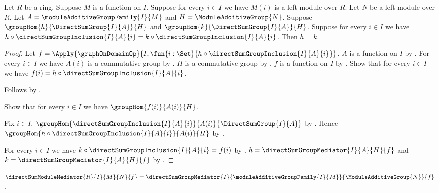 \begin{theorem}\label{direct_sum_module_additive_map_extensionality}
    Let $R$ be a ring.
    Suppose $M$ is a function on $I$.
    Suppose for every $i\in I$ we have $M(i)$ is a left module over $R$.
    Let $N$ be a left module over $R$.
    Let $A=\moduleAdditiveGroupFamily{I}{M}$ and
        $H=\ModuleAdditiveGroup{N}$.
    Suppose $\groupHom{h}{\DirectSumGroup{I}{A}}{H}$ and
        $\groupHom{k}{\DirectSumGroup{I}{A}}{H}$.
    Suppose for every $i\in I$ we have
        $h\circ\directSumGroupInclusion{I}{A}{i}
            =k\circ\directSumGroupInclusion{I}{A}{i}$.
    Then $h=k$.
\end{theorem}
\begin{proof}
    Let $f=\Apply{\graphOnDomainOp}{I,
        \fun{i:\Set}{h\circ\directSumGroupInclusion{I}{A}{i}}}$.
    $A$ is a function on $I$ by
        .
    For every $i\in I$ we have $A(i)$ is a commutative group by
        .
    $H$ is a commutative group by
        .
    $f$ is a function on $I$ by
        .
    Show that for every $i\in I$ we have
        $f(i)=h\circ\directSumGroupInclusion{I}{A}{i}$.
    \begin{subproof}
        Follows by .
    \end{subproof}
    Show that for every $i\in I$ we have $\groupHom{f(i)}{A(i)}{H}$.
    \begin{subproof}
        Fix $i\in I$.
        $\groupHom{\directSumGroupInclusion{I}{A}{i}}{A(i)}{
            \DirectSumGroup{I}{A}}$ by
            .
        Hence $\groupHom{
            h\circ\directSumGroupInclusion{I}{A}{i}}{A(i)}{H}$ by
            .
    \end{subproof}
    For every $i\in I$ we have
        $k\circ\directSumGroupInclusion{I}{A}{i}=f(i)$ by
        \auto.
    $h=\directSumGroupMediator{I}{A}{H}{f}$ and
        $k=\directSumGroupMediator{I}{A}{H}{f}$ by
        .
\end{proof}

\begin{definition}\label{direct_sum_module_mediator}
    $\directSumModuleMediator{R}{I}{M}{N}{f}
        =\directSumGroupMediator{I}{
            \moduleAdditiveGroupFamily{I}{M}}{
            \ModuleAdditiveGroup{N}}{f}$.
\end{definition}

